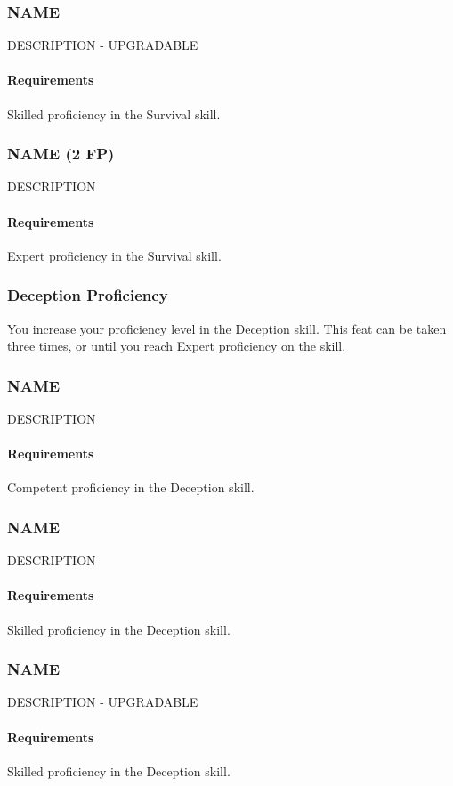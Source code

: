 \subsubsection{NAME} \label{feat::name}
    DESCRIPTION - UPGRADABLE
    \paragraph{Requirements} Skilled proficiency in the Survival skill.
\subsubsection{NAME (2 FP)} \label{feat::name}
    DESCRIPTION
    \paragraph{Requirements} Expert proficiency in the Survival skill.
\subsubsection{Deception Proficiency} \label{feat::deceptionprof}
    You increase your proficiency level in the Deception skill.
    This feat can be taken three times, or until you reach Expert proficiency on the skill.
\subsubsection{NAME} \label{feat::name}
    DESCRIPTION
    \paragraph{Requirements} Competent proficiency in the Deception skill.
\subsubsection{NAME} \label{feat::name}
    DESCRIPTION
    \paragraph{Requirements} Skilled proficiency in the Deception skill.
\subsubsection{NAME} \label{feat::name}
    DESCRIPTION - UPGRADABLE
    \paragraph{Requirements} Skilled proficiency in the Deception skill.
